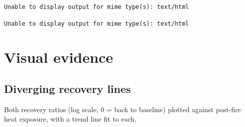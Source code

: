 \documentclass[
  letterpaper,
  DIV=11,
  numbers=noendperiod]{scrartcl}
\begin{document}
\begin{verbatim}
Unable to display output for mime type(s): text/html
\end{verbatim}

\begin{verbatim}
Unable to display output for mime type(s): text/html
\end{verbatim}

\section{Visual evidence}\label{visual-evidence}

\subsection{Diverging recovery lines}\label{diverging-recovery-lines}

Both recovery ratios (log scale, 0 = back to baseline) plotted against
post-fire heat exposure, with a trend line fit to each.
\end{document}
